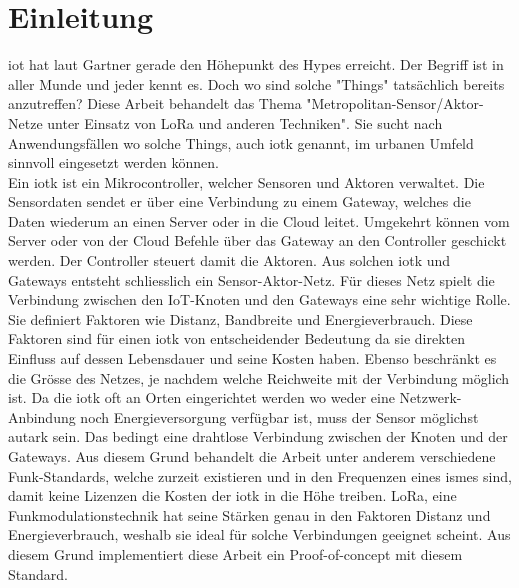 \chapter{Einleitung}

\acrfull{iot} hat laut Gartner gerade den Höhepunkt des Hypes erreicht. Der Begriff ist in aller Munde und jeder kennt es. Doch wo sind solche "Things" tatsächlich bereits anzutreffen? Diese Arbeit behandelt das Thema "Metropolitan-Sensor/Aktor-Netze unter Einsatz von LoRa und anderen Techniken". Sie sucht nach Anwendungsfällen wo solche Things, auch \gls{iotk} genannt, im urbanen Umfeld sinnvoll eingesetzt werden können.\\
Ein \gls{iotk} ist ein Mikrocontroller, welcher Sensoren und Aktoren verwaltet. Die Sensordaten sendet er über eine Verbindung zu einem Gateway, welches die Daten wiederum an einen Server oder in die Cloud leitet. Umgekehrt können vom Server oder von der Cloud Befehle über das Gateway an den Controller geschickt werden. Der Controller steuert damit die Aktoren. Aus solchen \gls{iotk} und  Gateways entsteht schliesslich ein Sensor-Aktor-Netz. Für dieses Netz spielt die Verbindung zwischen den IoT-Knoten und den Gateways eine sehr wichtige Rolle. Sie definiert Faktoren wie Distanz, Bandbreite und Energieverbrauch. Diese Faktoren sind für einen \gls{iotk} von entscheidender Bedeutung da sie direkten Einfluss auf dessen Lebensdauer und seine Kosten haben. Ebenso beschränkt es die Grösse des Netzes, je nachdem welche Reichweite mit der Verbindung möglich ist. Da die \gls{iotk} oft an Orten eingerichtet werden wo weder eine Netzwerk-Anbindung noch Energieversorgung verfügbar ist, muss der Sensor möglichst autark sein. Das bedingt eine drahtlose Verbindung zwischen der Knoten und der Gateways. Aus diesem Grund behandelt die Arbeit unter anderem verschiedene Funk-Standards, welche zurzeit existieren und in den Frequenzen eines \gls{ism}es sind, damit keine Lizenzen die Kosten der \gls{iotk} in die Höhe treiben. LoRa, eine Funkmodulationstechnik hat seine Stärken genau in den Faktoren Distanz und Energieverbrauch, weshalb sie ideal für solche Verbindungen geeignet scheint. Aus diesem Grund implementiert diese Arbeit ein Proof-of-concept mit diesem Standard. 